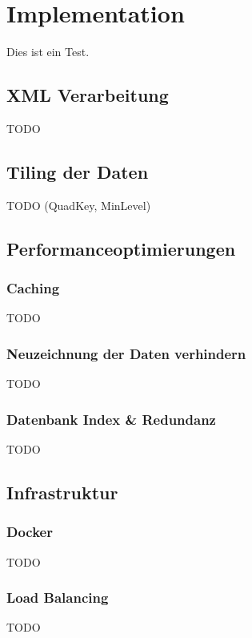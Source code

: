 
\chapter{Implementation}
Dies ist ein Test. \cite{Matthews201111}
\section{XML Verarbeitung}
\begin{flushleft}
TODO
\end{flushleft}
\section{Tiling der Daten}
\begin{flushleft}
TODO (QuadKey, MinLevel)
\end{flushleft}
\section{Performanceoptimierungen}
\subsection{Caching}
\begin{flushleft}
TODO
\end{flushleft}
\subsection{Neuzeichnung der Daten verhindern}
\begin{flushleft}
TODO
\end{flushleft}
\subsection{Datenbank Index \& Redundanz}
\begin{flushleft}
TODO
\end{flushleft}
\section{Infrastruktur}
\subsection{Docker}
\begin{flushleft}
TODO
\end{flushleft}
\subsection{Load Balancing}
\begin{flushleft}
TODO
\end{flushleft}